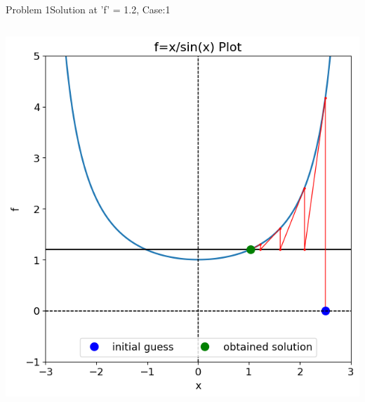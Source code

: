 \documentclass{beamer}
\begin{document}
\begin{frame}{Problem 1}{Solution at 'f' = 1.2, Case:1}
\begin{columns}
\begin{block}{}
            \includegraphics[width=\textwidth]{Figures/prob1_sol12.png}
        \end{block}
    \end{columns}
\end{frame}
\end{document}
